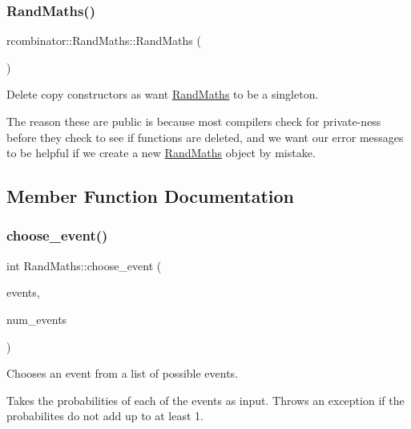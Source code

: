 \subsubsection{\texorpdfstring{Rand\+Maths()}{RandMaths()}}
{\footnotesize\ttfamily rcombinator\+::\+Rand\+Maths\+::\+Rand\+Maths (\begin{DoxyParamCaption}\item[{\mbox{\hyperlink{classrcombinator_1_1RandMaths}{Rand\+Maths}} const \&}]{ }\end{DoxyParamCaption})\hspace{0.3cm}{\ttfamily [delete]}}



Delete copy constructors as want \mbox{\hyperlink{classrcombinator_1_1RandMaths}{Rand\+Maths}} to be a singleton. 

The reason these are public is because most compilers check for private-\/ness before they check to see if functions are deleted, and we want our error messages to be helpful if we create a new \mbox{\hyperlink{classrcombinator_1_1RandMaths}{Rand\+Maths}} object by mistake. 

\subsection{Member Function Documentation}
\mbox{\label{classrcombinator_1_1RandMaths_afbc0d35bd9744ecab1983914ac32d68c}} 
\subsubsection{\texorpdfstring{choose\+\_\+event()}{choose\_event()}}
{\footnotesize\ttfamily int Rand\+Maths\+::choose\+\_\+event (\begin{DoxyParamCaption}\item[{double $\ast$}]{events,  }\item[{long}]{num\+\_\+events }\end{DoxyParamCaption})}



Chooses an event from a list of possible events. 

Takes the probabilities of each of the events as input. Throws an exception if the probabilites do not add up to at least 1.

